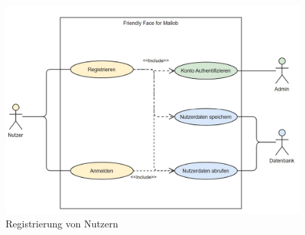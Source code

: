 \begin{figure}[H]
    \centering    
    \includegraphics[width=\textwidth]{images-interface/Login_register_3_screenshot.jpg} 
    \caption{Registrierung von Nutzern}
\end{figure}


